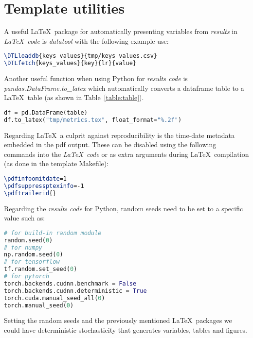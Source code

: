 \documentclass[journal]{IEEEtran}
\begin{document}
\section{Template utilities}

A useful \LaTeX\ package for automatically presenting variables from \textit{results} in \textit{\LaTeX\ code} is \textit{datatool} with the following example use:
\begin{lstlisting}[language=TeX, style=lststyle, caption={\LaTeX\ datatool example of loading a file that contains pairs of keys and values (tmp/keys\_values.csv) generated by a \textit{results code} and getting the value of a key named lr.}]
\DTLloaddb{keys_values}{tmp/keys_values.csv}
\DTLfetch{keys_values}{key}{lr}{value}
\end{lstlisting}

Another useful function when using Python for \textit{results code} is \textit{pandas.DataFrame.to\_latex} which automatically converts a dataframe table to a \LaTeX\ table (as shown in Table~\ref{table:table}).
\begin{lstlisting}[language=python, style=lststyle, caption={Convert Pandas DataFrame to \LaTeX\ table.}]
df = pd.DataFrame(table)
df.to_latex("tmp/metrics.tex", float_format="%.2f")
\end{lstlisting}

Regarding \LaTeX\ a culprit against reproducibility is the time-date metadata embedded in the pdf output.
These can be disabled using the following commands into the \textit{\LaTeX\ code} or as extra arguments during \LaTeX\ compilation (as done in the template Makefile):
\begin{lstlisting}[language=TeX, style=lststyle, caption={\LaTeX\ pdf reproducibility commands.}]
\pdfinfoomitdate=1
\pdfsuppressptexinfo=-1
\pdftrailerid{}
\end{lstlisting}

Regarding the \textit{results code} for Python, random seeds need to be set to a specific value such as:
\begin{lstlisting}[language=python, style=lststyle, caption={Python reproducibility commands for some popular libraries.}]
# for build-in random module
random.seed(0)
# for numpy
np.random.seed(0)
# for tensorflow
tf.random.set_seed(0)
# for pytorch
torch.backends.cudnn.benchmark = False
torch.backends.cudnn.deterministic = True
torch.cuda.manual_seed_all(0)
torch.manual_seed(0)
\end{lstlisting}

Setting the random seeds and the previously mentioned \LaTeX\ packages we could have deterministic stochasticity that generates variables, tables and figures.
\end{document}

